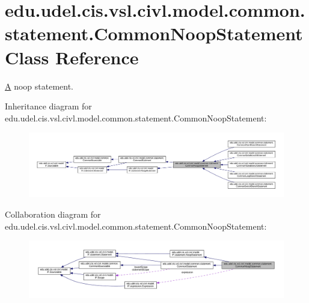 \hypertarget{classedu_1_1udel_1_1cis_1_1vsl_1_1civl_1_1model_1_1common_1_1statement_1_1CommonNoopStatement}{}\section{edu.\+udel.\+cis.\+vsl.\+civl.\+model.\+common.\+statement.\+Common\+Noop\+Statement Class Reference}
\label{classedu_1_1udel_1_1cis_1_1vsl_1_1civl_1_1model_1_1common_1_1statement_1_1CommonNoopStatement}


\hyperlink{structA}{A} noop statement.  




Inheritance diagram for edu.\+udel.\+cis.\+vsl.\+civl.\+model.\+common.\+statement.\+Common\+Noop\+Statement\+:
\nopagebreak
\begin{figure}[H]
\begin{center}
\leavevmode
\includegraphics[width=350pt]{classedu_1_1udel_1_1cis_1_1vsl_1_1civl_1_1model_1_1common_1_1statement_1_1CommonNoopStatement__inherit__graph}
\end{center}
\end{figure}


Collaboration diagram for edu.\+udel.\+cis.\+vsl.\+civl.\+model.\+common.\+statement.\+Common\+Noop\+Statement\+:
\nopagebreak
\begin{figure}[H]
\begin{center}
\leavevmode
\includegraphics[width=350pt]{classedu_1_1udel_1_1cis_1_1vsl_1_1civl_1_1model_1_1common_1_1statement_1_1CommonNoopStatement__coll__graph}
\end{center}
\end{figure}
